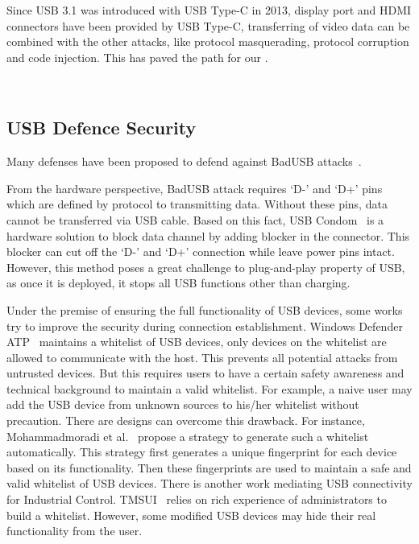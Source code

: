 Since USB 3.1 was introduced with USB Type-C in 2013, display port and HDMI
connectors have been provided by USB Type-C, transferring of video data can be
combined with the other attacks, like protocol masquerading,  protocol
corruption and code injection. This has paved the path for our \tool.




\\


\subsection{USB Defence Security}
\label{subsec:usb_defence}
Many defenses have been proposed to defend against BadUSB attacks~\cite{sok}.

From the hardware perspective, BadUSB attack requires `D-' and `D+' pins which
are defined by protocol to transmitting data.  Without these pins, data cannot
be transferred via USB cable. Based
on this fact, USB Condom~\cite{Condom} is a hardware solution to block data
channel by adding blocker in the connector. This blocker can cut off the `D-'
and `D+' connection while leave power pins intact.  However, this method poses
a great challenge to plug-and-play property of USB, as once it is deployed, it
stops all USB functions other than charging.

Under the premise of ensuring the full functionality of USB devices, some works
try to improve the security during connection establishment.  Windows Defender
ATP~\cite{windenfenderwhite} maintains a whitelist of USB devices, only devices
on the whitelist are allowed to communicate with the host. This prevents all
potential attacks from untrusted devices. But this requires users to have a
certain safety awareness and technical background to maintain a valid
whitelist. For example, a naive user may add the USB device from unknown
sources to his/her whitelist without precaution. There are designs can overcome
this drawback. For instance, Mohammadmoradi et
al.~\cite{mohammadmoradi2018making} propose a strategy to generate such a
whitelist automatically. This strategy first generates a unique fingerprint for
each device based on its functionality. Then these fingerprints are used to
maintain a safe and valid whitelist of USB devices. There is another work
mediating USB connectivity for Industrial Control. TMSUI~\cite{yang2015tmsui}
relies on rich experience of administrators to build a whitelist. However, some
modified USB devices may hide their real functionality from the user.


